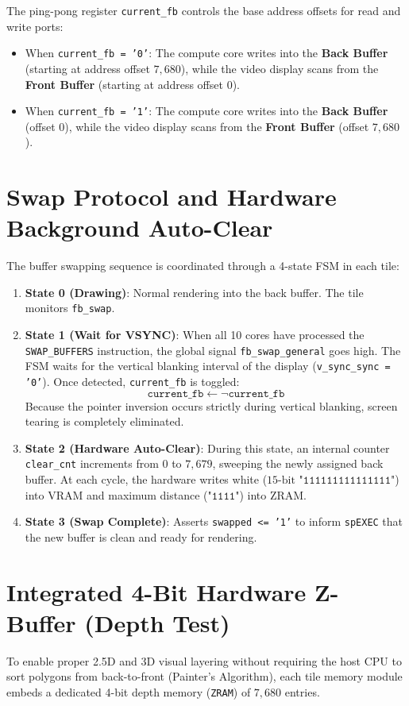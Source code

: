 The ping-pong register \texttt{current\_fb} controls the base address offsets for read and write ports:
\begin{itemize}
    \item When \texttt{current\_fb = '0'}: The compute core writes into the \textbf{Back Buffer} (starting at address offset $7{,}680$), while the video display scans from the \textbf{Front Buffer} (starting at address offset $0$).
    \item When \texttt{current\_fb = '1'}: The compute core writes into the \textbf{Back Buffer} (offset $0$), while the video display scans from the \textbf{Front Buffer} (offset $7{,}680$).
\end{itemize}

\section{Swap Protocol and Hardware Background Auto-Clear}
The buffer swapping sequence is coordinated through a 4-state FSM in each tile:
\begin{enumerate}
    \item \textbf{State 0 (Drawing)}: Normal rendering into the back buffer. The tile monitors \texttt{fb\_swap}.
    \item \textbf{State 1 (Wait for VSYNC)}: When all 10 cores have processed the \texttt{SWAP\_BUFFERS} instruction, the global signal \texttt{fb\_swap\_general} goes high. The FSM waits for the vertical blanking interval of the display (\texttt{v\_sync\_sync = '0'}). Once detected, \texttt{current\_fb} is toggled:
    \begin{equation}
    \texttt{current\_fb} \gets \neg \texttt{current\_fb}
    \end{equation}
    Because the pointer inversion occurs strictly during vertical blanking, screen tearing is completely eliminated.
    \item \textbf{State 2 (Hardware Auto-Clear)}: During this state, an internal counter \texttt{clear\_cnt} increments from $0$ to $7{,}679$, sweeping the newly assigned back buffer. At each cycle, the hardware writes white ($15\text{-bit } \texttt{"111111111111111"}$) into VRAM and maximum distance ($\texttt{"1111"}$) into ZRAM.
    \item \textbf{State 3 (Swap Complete)}: Asserts \texttt{swapped <= '1'} to inform \texttt{spEXEC} that the new buffer is clean and ready for rendering.
\end{enumerate}

\section{Integrated 4-Bit Hardware Z-Buffer (Depth Test)}
To enable proper 2.5D and 3D visual layering without requiring the host CPU to sort polygons from back-to-front (Painter's Algorithm), each tile memory module embeds a dedicated 4-bit depth memory (\texttt{ZRAM}) of $7{,}680$ entries.

